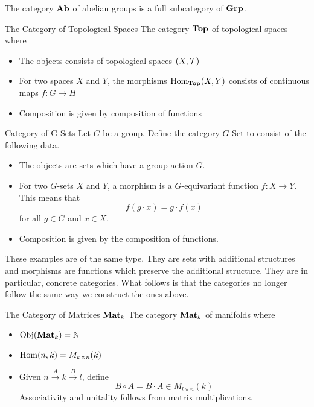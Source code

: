 \documentclass[a4paper]{article}
\begin{document}
The category $\bold{Ab}$ of abelian groups is a full subcategory of $\bold{Grp}$. 

\begin{defn}{The Category of Topological Spaces}{} The category $\bold{Top}$ of topological spaces where 
\begin{itemize}
\item The objects consists of topological spaces $(X,\mathcal{T})$
\item For two spaces $X$ and $Y$, the morphisms $\operatorname{Hom}_\bold{Top}(X,Y)$ consists of continuous maps $f:G\to H$
\item Composition is given by composition of functions
\end{itemize}
\end{defn}

\begin{defn}{Category of G-Sets}{} Let $G$ be a group. Define the category $G\text{-Set}$ to consist of the following data. 
\begin{itemize}
\item The objects are sets which have a group action $G$. 
\item For two $G$-sets $X$ and $Y$, a morphism is a $G$-equivariant function $f:X\to Y$. This means that $$f(g\cdot x)=g\cdot f(x)$$ for all $g\in G$ and $x\in X$. 
\item Composition is given by the composition of functions. 
\end{itemize}
\end{defn}

These examples are of the same type. They are sets with additional structures and morphisms are functions which preserve the additional structure. They are in particular, concrete categories. What follows is that the categories no longer follow the same way we construct the ones above. 

\begin{defn}{The Category of Matrices $\bold{Mat}_k$}{} The category $\bold{Mat}_k$ of manifolds where 
\begin{itemize}
\item $\operatorname{Obj}(\bold{Mat}_k)=\mathbb{N}$
\item $\operatorname{Hom}(n,k)=M_{k\times n}(k)$
\item Given $n\overset{A}{\rightarrow}k\overset{B}{\rightarrow}l$, define $$B\circ A=B\cdot A\in M_{l\times n}(k)$$ Associativity and unitality follows from matrix multiplications. 
\end{itemize}
\end{defn}
\end{document}
